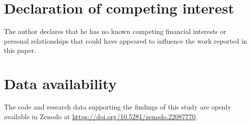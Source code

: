 \documentclass[preprint,12pt]{elsarticle}
\numberwithin{equation}{section}
\theoremstyle{plain}
\theoremstyle{definition}
\theoremstyle{remark}
\begin{document}
\section*{Declaration of competing interest}
The author declares that he has no known competing financial interests or personal relationships that could have appeared to influence the work reported in this paper.

\section*{Data availability}
The code and research data supporting the findings of this study are openly available in Zenodo at \url{https://doi.org/10.5281/zenodo.22087770}.



\end{document}
